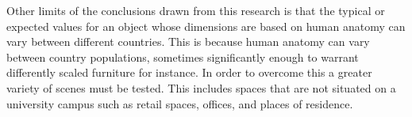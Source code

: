 Other limits of the conclusions drawn from this research is that the typical or expected values for an object whose dimensions are based on human anatomy can vary between different countries. This is because human anatomy can vary between country populations, sometimes significantly enough to warrant differently scaled furniture for instance. In order to overcome this a greater variety of scenes must be tested. This includes spaces that are not situated on a university campus such as retail spaces, offices, and places of residence. 

